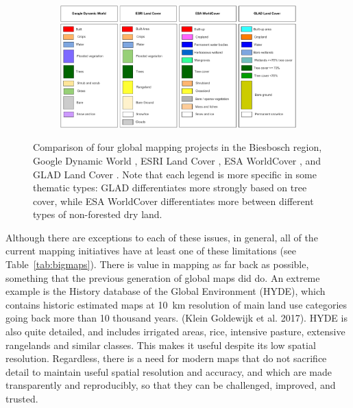 \begin{figure}[H]
\begin{subfigure}[t]{0.243\textwidth}
    \end{subfigure}
    
    \begin{subfigure}[b]{\textwidth}
        \centering
        \includegraphics[width=\textwidth]{figs_01/thesis_legends-harmonized.pdf}
    \end{subfigure}
    
    \caption{Comparison of four global mapping projects in the Biesbosch region, Google Dynamic World \citep{brown2022dynamic}, ESRI Land Cover \citep{karra2021global}, ESA WorldCover \citep{kerchove2021esa}, and GLAD Land Cover \citep{potapov2022global}. Note that each legend is more specific in some thematic types: GLAD differentiates more strongly based on tree cover, while ESA WorldCover differentiates more between different types of non-forested dry land.}
    \label{fig:bigmaps_biesbosch}
\end{figure}


 
    Although there are exceptions to each of these issues, in general, all of the current mapping initiatives have at least one of these limitations (see Table\@~\ref{tab:bigmaps}). There is value in mapping as far back as possible, something that the previous generation of global maps did do. An extreme example is the History database of the Global Environment (HYDE), which contains historic estimated maps at 10~km resolution of main land use categories going back more than 10 thousand years. (Klein Goldewijk et al. 2017). HYDE is also quite detailed, and includes irrigated areas, rice, intensive pasture, extensive rangelands and similar classes. This makes it useful despite its low spatial resolution. Regardless, there is a need for modern maps that do not sacrifice detail to maintain useful spatial resolution and accuracy, and which are made transparently and reproducibly, so that they can be challenged, improved, and trusted.

